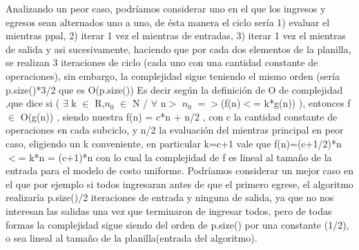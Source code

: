 \newline
Analizando  un peor caso, podrí­amos considerar uno en el que los ingresos y egresos sean alternados uno a uno, de ésta manera el ciclo serí­a  1) evaluar el mientras ppal, 2)  iterar 1 vez  el mientras de entradas, 3) iterar 1 vez el mientras de salida  y asi sucesivamente, haciendo que  por cada dos elementos de la planilla, se realizan 3 iteraciones de ciclo (cada uno con una cantidad constante de operaciones), sin embargo, la complejidad sigue teniendo el mismo orden (serí­a p.size()*3/2 que es O(p.size())
\newline
Es decir según la definición de O de complejidad ,que dice 
\newline
si ( $\exists$ k $\in$ R,$n_0$ $\in$ N / $\forall$ n$>$ $n_0$ $=>$(f(n)$<$= k*g(n)) ), entonces f $\in$ O(g(n)) , siendo nuestra f(n) = c*n + n/2 , con c la cantidad constante de operaciones en cada subciclo, y n/2 la evaluación del mientras principal en peor caso, eligiendo un k conveniente, en particular k=c+1 vale que
\newline
 f(n)=(c+1/2)*n $<$= k*n = (c+1)*n 
\newline 
 con lo cual la complejidad de f es lineal al tamaño de la entrada para el modelo de costo uniforme.   
\newline
Podrí­amos considerar un mejor caso en el que por ejemplo si  todos ingresaran antes de que el primero egrese, el algoritmo realizarí­a p.size()/2 iteraciones de entrada y ninguna de salida, ya que no nos interesan las salidas una vez que terminaron de ingresar todos, pero de todas formas la complejidad sigue siendo del orden de p.size() por una constante (1/2), o sea lineal al tamaño de la planilla(entrada del algoritmo).
\newline 